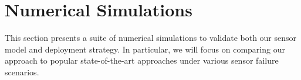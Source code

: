 \documentclass[letterpaper, 10 pt, conference]{ieeeconf}
\begin{document}
\section{Numerical Simulations}
\label{sec:sec7}
This section presents a suite of numerical simulations to validate both our sensor model and deployment strategy. In particular, we will focus on comparing our approach to popular state-of-the-art approaches under various sensor failure scenarios.
\end{document}
